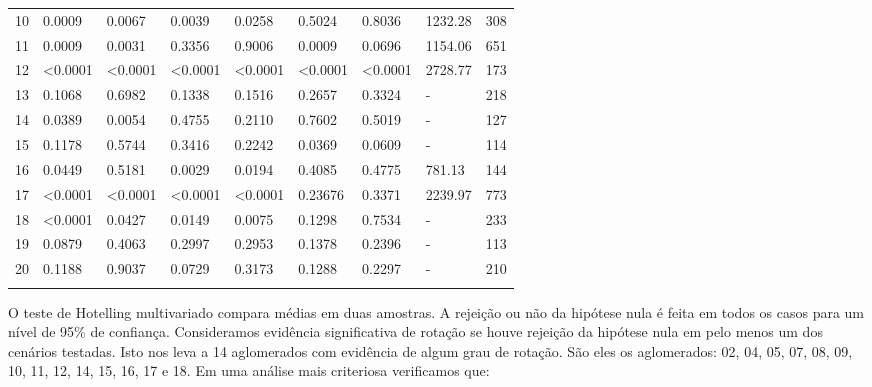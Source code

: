 \begin{table}[H]
{\begin{tabular}{lllllllll}
10  &  {\color{red}0.0009} & {\color{red}0.0067} &  {\color{red}0.0039} & {\color{red}0.0258} & 0.5024 & 0.8036 & 1232.28 & 308 \\ 
11  &  {\color{red}0.0009} & {\color{red}0.0031} &  0.3356 &  0.9006 & {\color{red}0.0009} & 0.0696 & 1154.06 & 651 \\ 
12  &  {\color{red}<0.0001}  & {\color{red}<0.0001} & {\color{red}<0.0001} & {\color{red}<0.0001} & {\color{red}<0.0001} &  {\color{red}<0.0001} & 2728.77 & 173 \\ 
13  &  0.1068 & 0.6982 &  0.1338 &  0.1516 & 0.2657 & 0.3324 & - & 218 \\ 
14  &  {\color{red}0.0389} & {\color{red}0.0054} & 0.4755 &  0.2110 & 0.7602 & 0.5019 & - & 127 \\ 
15  &  0.1178 & 0.5744 &  0.3416 &  0.2242 & {\color{red}0.0369} & 0.0609 & - & 114 \\ 
16  &  {\color{red}0.0449} & 0.5181 & {\color{red}0.0029} &  {\color{red}0.0194} & 0.4085 & 0.4775 & 781.13 & 144  \\ 
17  &  {\color{red}<0.0001}  & {\color{red}<0.0001} & {\color{red}<0.0001} & {\color{red}<0.0001} & 0.23676 & 0.3371 & 2239.97 & 773 \\ 
18  &  {\color{red}<0.0001} & {\color{red}0.0427} & {\color{red}0.0149} &  {\color{red}0.0075} & 0.1298 & 0.7534 & - & 233 \\ 
19  &  0.0879 & 0.4063 &  0.2997 &  0.2953 & 0.1378 & 0.2396 & - & 113 \\ 
20  &  0.1188 & 0.9037 &  0.0729 &  0.3173 & 0.1288 & 0.2297 & - & 210 \\ \hline
\label{tab:selec20T}
\end{tabular}
}
\end{table}

 O teste de Hotelling multivariado compara médias em duas amostras. A rejeição ou não da hipótese nula é feita em todos os casos para um nível de 95\% de confiança. Consideramos evidência significativa de rotação se houve rejeição da hipótese nula em pelo menos um dos cenários testadas. Isto nos leva a 14 aglomerados com evidência de algum grau de rotação. São eles os aglomerados: 02, 04, 05, 07, 08, 09, 10, 11, 12, 14, 15, 16, 17 e 18. Em uma análise mais criteriosa verificamos que:

